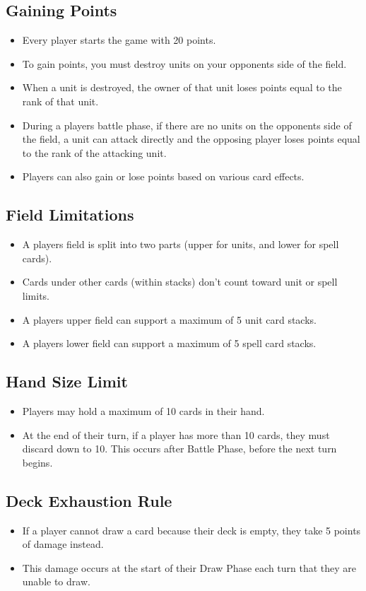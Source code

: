 \subsection{Gaining Points}
\begin{itemize}
    \item Every player starts the game with 20 points.
    \item To gain points, you must destroy units on your opponents side of the field.
    \item When a unit is destroyed, the owner of that unit loses points equal to the rank of that unit.
    \item During a players battle phase, if there are no units on the opponents side of the field, a unit can attack directly and the opposing player loses points equal to the rank of the attacking unit.
    \item Players can also gain or lose points based on various card effects.
\end{itemize}








\subsection{Field Limitations}
\begin{itemize}
    \item A players field is split into two parts (upper for units, and lower for spell cards).
    \item Cards under other cards (within stacks) don’t count toward unit or spell limits.
    \item A players upper field can support a maximum of 5 unit card stacks.
    \item A players lower field can support a maximum of 5 spell card stacks.
\end{itemize}








\subsection{Hand Size Limit}
\begin{itemize}
    \item Players may hold a maximum of 10 cards in their hand.
    \item At the end of their turn, if a player has more than 10 cards, they must discard down to 10. This occurs after Battle Phase, before the next turn begins.
\end{itemize}







\subsection{Deck Exhaustion Rule}
\begin{itemize}
    \item If a player cannot draw a card because their deck is empty, they take 5 points of damage instead.
    \item This damage occurs at the start of their Draw Phase each turn that they are unable to draw.
\end{itemize}




